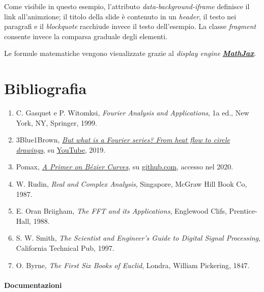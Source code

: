 \documentclass[
]{book}
\providecommand{\tightlist}{%
  \setlength{\itemsep}{0pt}\setlength{\parskip}{0pt}}
\begin{document}
Come visibile in questo esempio, l'attributo \emph{data-background-iframe} definisce il link all'animzione; il titolo della slide è contenuto in un \emph{header}, il testo nei paragrafi e il \emph{blockquote} racchiude invece il testo dell'esempio. La classe \emph{fragment} consente invece la comparsa graduale degli elementi.

Le formule matematiche vengono visualizzate grazie al \emph{display engine} \href{https://www.mathjax.org/}{\emph{\textbf{MathJax}}}.

\hypertarget{bibliografia}{%
\chapter*{Bibliografia}\label{bibliografia}}

\begin{enumerate}
\def\labelenumi{\arabic{enumi}.}
\tightlist
\item
  C. Gasquet e P. Witomksi, \emph{Fourier Analysis and Applications}, 1a ed., New York, NY, Springer, 1999.
\item
  3Blue1Brown, \href{www.youtube.com/watch?v=r6sGWTCMz2k}{\emph{But what is a Fourier series? From heat flow to circle drawings}}, su \href{https://www.youtube.com}{YouTube}, 2019.
\item
  Pomax, \href{https://pomax.github.io/bezierinfo/\#polybezier}{\emph{A Primer on Bézier Curves}}, su \href{https://github.com/}{github.com}, accesso nel 2020.
\item
  W. Rudin, \emph{Real and Complex Analysis}, Singapore, McGraw Hill Book Co, 1987.
\item
  E. Oran Briigham, \emph{The FFT and its Applications}, Englewood Clifs, Prentice-Hall, 1988.
\item
  S. W. Smith, \emph{The Scientist and Engineer's Guide to Digital Signal Processing}, California Technical Pub, 1997.
\item
  O. Byrne, \emph{The First Six Books of Euclid}, Londra, William Pickering, 1847.
\end{enumerate}

\hypertarget{documentazione}{%
\subsubsection*{Documentazioni}\label{documentazione}}
\end{document}
